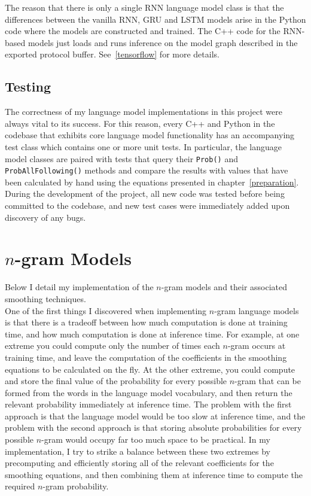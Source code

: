 \documentclass[a4paper, 12pt]{report}
\newcommand{\ttt}[1]{\texttt{#1}}
\begin{document}
The reason that there is only a single RNN language model class is that the differences between the vanilla RNN, GRU and LSTM models arise in the Python code where the models are constructed and trained. The C++ code for the RNN-based models just loads and runs inference on the model graph described in the exported protocol buffer. See~\ref{tensorflow} for more details.

\subsection{Testing}

The correctness of my language model implementations in this project were always vital to its success. For this reason, every C++ and Python in the codebase that exhibits core language model functionality has an accompanying test class which contains one or more unit tests. In particular, the language model classes are paired with tests that query their \ttt{Prob()} and \ttt{ProbAllFollowing()} methods and compare the results with values that have been calculated by hand using the equations presented in chapter~\ref{preparation}. \\

During the development of the project, all new code was tested before being committed to the codebase, and new test cases were immediately added upon discovery of any bugs.

\section{$n$-gram Models} \label{ngram_lm}

Below I detail my implementation of the $n$-gram models and their associated smoothing techniques. \\

One of the first things I discovered when implementing $n$-gram language models is that there is a tradeoff between how much computation is done at training time, and how much computation is done at inference time. For example, at one extreme you could compute only the number of times each $n$-gram occurs at training time, and leave the computation of the coefficients in the smoothing equations to be calculated on the fly. At the other extreme, you could compute and store the final value of the probability for every possible $n$-gram that can be formed from the words in the language model vocabulary, and then return the relevant probability immediately at inference time. The problem with the first approach is that the language model would be too slow at inference time, and the problem with the second approach is that storing absolute probabilities for every possible $n$-gram would occupy far too much space to be practical. In my implementation, I try to strike a balance between these two extremes by precomputing and efficiently storing all of the relevant coefficients for the smoothing equations, and then combining them at inference time to compute the required $n$-gram probability. \\
\end{document}
